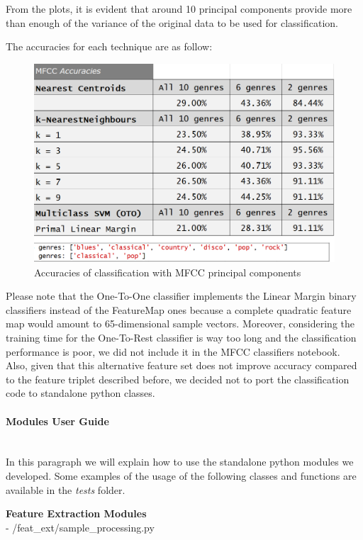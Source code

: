 \documentclass[12pt]{article}
\begin{document}
	From the plots, it is evident that around 10 principal components provide more than enough of the variance of the original data to be used for classification.
	
	The accuracies for each technique are as follow:
	\begin{figure}[H]
		\hspace{120pt}\includegraphics[scale=0.44]{mfcc_acc}
		\caption{Accuracies of classification with MFCC principal components}
	\end{figure}
	Please note that the One-To-One classifier implements the Linear Margin binary classifiers instead of the FeatureMap ones because a complete quadratic feature map would amount to 65-dimensional sample vectors.
	Moreover, considering the training time for the One-To-Rest classifier is way too long and the classification performance is poor, we did not include it in the MFCC classifiers notebook.
	Also, given that this alternative feature set does not improve accuracy compared to the feature triplet described before, we decided not to port the classification code to standalone python classes.
	\newpage
	
	\paragraph{Modules User Guide}\mbox{}\\
	In this paragraph we will explain how to use the standalone python modules we developed. Some examples of the usage of the following classes and functions are available in the \textit{tests} folder.
	
	\textbf{Feature Extraction Modules}\mbox{}\\
	- /feat\_ext/sample\_processing.py
	
\end{document}
